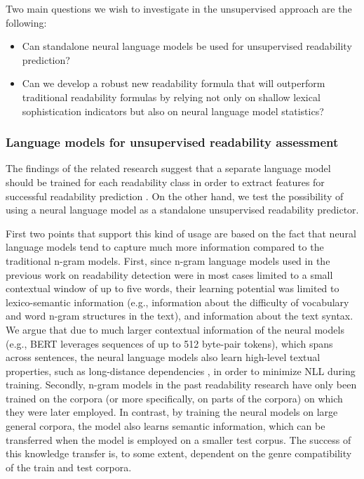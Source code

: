 \documentclass{clv3}
\begin{document}
Two main questions we wish to investigate in the unsupervised approach are the following:
\begin{itemize}
    \item Can standalone neural language models be used for unsupervised readability prediction?
    \item Can we develop a robust new readability formula that will outperform traditional readability formulas by relying not only on shallow lexical sophistication indicators but also on neural language model statistics?  
\end{itemize}

\subsubsection{Language models for unsupervised readability assessment}
\label{sec:lm_for_readability_assessment}

The findings of the related research suggest that a separate language model should be trained for each readability class in order to extract features for successful readability prediction \citep{petersen2009machine, xia2016text}. On the other hand, we test the possibility of using a neural language model as a standalone unsupervised readability predictor. 

First two points that support this kind of usage are based on the fact that neural language models tend to capture much more information compared to the traditional n-gram models. First, since n-gram language models used in the previous work on readability detection were in most cases limited to a small contextual window of up to five words, their learning potential was limited to lexico-semantic information (e.g., information about the difficulty of vocabulary and word n-gram structures in the text), and information about the text syntax. We argue that due to much larger contextual information of the neural models (e.g., BERT leverages sequences of up to 512 byte-pair tokens), which spans across sentences, the neural language models also learn high-level textual properties, such as long-distance dependencies \citep{jawahar-etal-2019-bert}, in order to minimize NLL during training. Secondly, n-gram models in the past readability research have only been trained on the corpora (or more specifically, on parts of the corpora) on which they were later employed. In contrast, by training the neural models on large general corpora, the model also learns semantic information, which can be transferred when the model is employed on a smaller test corpus. The success of this knowledge transfer is, to some extent, dependent on the genre compatibility of the train and test corpora. 
\end{document}
